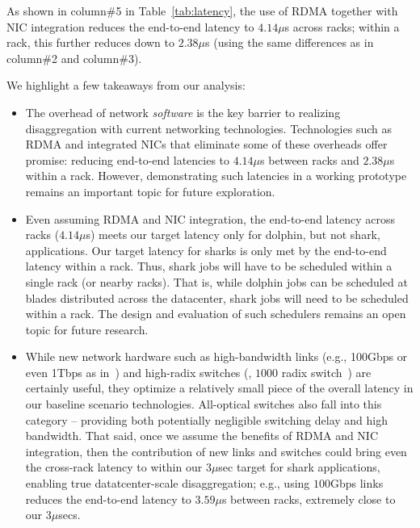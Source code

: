 As shown in column\#5 in Table~\ref{tab:latency}, the use of RDMA together with NIC integration reduces the end-to-end latency to $4.14\mu$s across racks; within a rack, this further reduces down to $2.38\mu$s (using the same differences as in column\#2 and column\#3).

 We highlight a few takeaways from our analysis:

\begin{itemize}[leftmargin=*]
\itemsep0em
	\item The overhead of network \emph{software} is the key barrier to realizing disaggregation with current networking technologies. Technologies such as RDMA and integrated NICs that eliminate some of these overheads offer promise: reducing end-to-end latencies to $4.14\mu$s between racks and $2.38\mu$s within a rack. However, demonstrating such latencies in a working prototype remains an important topic for future exploration.
	\item Even assuming RDMA and NIC integration, the end-to-end latency across racks ($4.14\mu$s) meets our target latency only for dolphin, but not shark, applications. Our target latency for sharks is only met by the end-to-end latency within a rack. Thus, shark jobs will have to be scheduled within a single rack (or nearby racks).
	That is, while dolphin jobs can be scheduled at blades distributed across the datacenter, shark jobs will need to be scheduled within a rack. The design and evaluation of such schedulers remains an open topic for future research.
	\item While new network hardware such as high-bandwidth links (e.g., 100Gbps or even 1Tbps as in~\cite{vladimir, firebox}) and high-radix switches (\eg, $1000$ radix switch~\cite{firebox})  are certainly useful, they optimize a relatively small piece of the overall latency in our baseline scenario technologies. All-optical switches also fall into this category -- providing both potentially negligible switching delay and high bandwidth. That said, once we assume the benefits of RDMA and NIC integration, then the contribution of new links and switches could bring even the cross-rack latency to within our 3$\mu$sec target for shark applications, enabling true datatcenter-scale disaggregation; e.g., using $100$Gbps links reduces the end-to-end latency to $3.59\mu$s between racks, extremely close to our 3$\mu$secs. 

\end{itemize}
